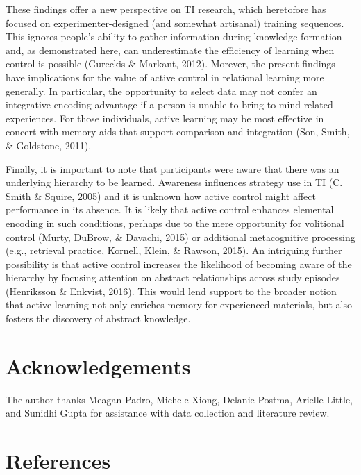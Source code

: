 \documentclass[floatsintext,man]{apa6}
\theoremstyle{definition}
\theoremstyle{definition}
\theoremstyle{definition}
\theoremstyle{remark}
\begin{document}
These findings offer a new perspective on TI research, which heretofore
has focused on experimenter-designed (and somewhat artisanal) training
sequences. This ignores people's ability to gather information during
knowledge formation and, as demonstrated here, can underestimate the
efficiency of learning when control is possible (Gureckis \& Markant,
2012). Morever, the present findings have implications for the value of
active control in relational learning more generally. In particular, the
opportunity to select data may not confer an integrative encoding
advantage if a person is unable to bring to mind related experiences.
For those individuals, active learning may be most effective in concert
with memory aids that support comparison and integration (Son, Smith, \&
Goldstone, 2011).

Finally, it is important to note that participants were aware that there
was an underlying hierarchy to be learned. Awareness influences strategy
use in TI (C. Smith \& Squire, 2005) and it is unknown how active
control might affect performance in its absence. It is likely that
active control enhances elemental encoding in such conditions, perhaps
due to the mere opportunity for volitional control (Murty, DuBrow, \&
Davachi, 2015) or additional metacognitive processing (e.g., retrieval
practice, Kornell, Klein, \& Rawson, 2015). An intriguing further
possibility is that active control increases the likelihood of becoming
aware of the hierarchy by focusing attention on abstract relationships
across study episodes (Henriksson \& Enkvist, 2016). This would lend
support to the broader notion that active learning not only enriches
memory for experienced materials, but also fosters the discovery of
abstract knowledge.

\section{Acknowledgements}\label{acknowledgements}

The author thanks Meagan Padro, Michele Xiong, Delanie Postma, Arielle
Little, and Sunidhi Gupta for assistance with data collection and
literature review.

\newpage

\section{References}\label{references}

\begingroup
\setlength{\parindent}{-0.5in} \setlength{\leftskip}{0.5in}
\end{document}
